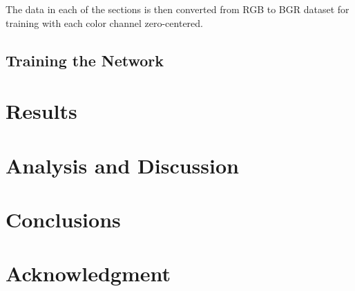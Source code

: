 \documentclass[conference]{IEEEtran}
\begin{document}

The data in each of the sections is then converted from RGB to BGR dataset for training with each color channel zero-centered. 

\subsection{Training the Network}

\section{Results}

\section{Analysis and Discussion}

\section{Conclusions}

\section*{Acknowledgment}


\end{document}
